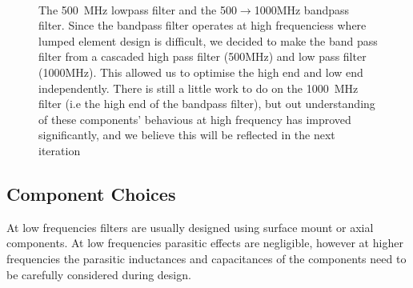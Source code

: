 

 
\begin{figure}
 \centering
{}\\
\label{fig:LowFrequencyFilters} 
\caption{The 500~MHz lowpass filter and the 500$\rightarrow$1000MHz bandpass filter. Since the bandpass filter operates at high frequenciess where lumped element design is difficult, we decided to make the band pass filter from a cascaded high pass filter (500MHz) and low pass filter (1000MHz). This allowed us to optimise the high end and low end independently. There is still a little work to do on the 1000~MHz filter (i.e the high end of the bandpass filter), but out understanding of these components' behavious at high frequency has improved significantly, and we believe this will be reflected in the next iteration}
\end{figure}


 \subsection{Component Choices}
At low frequencies filters are usually designed using surface mount or axial components. At low frequencies parasitic effects are negligible, however at higher frequencies the parasitic inductances and capacitances of the components need to be carefully considered during design. 

